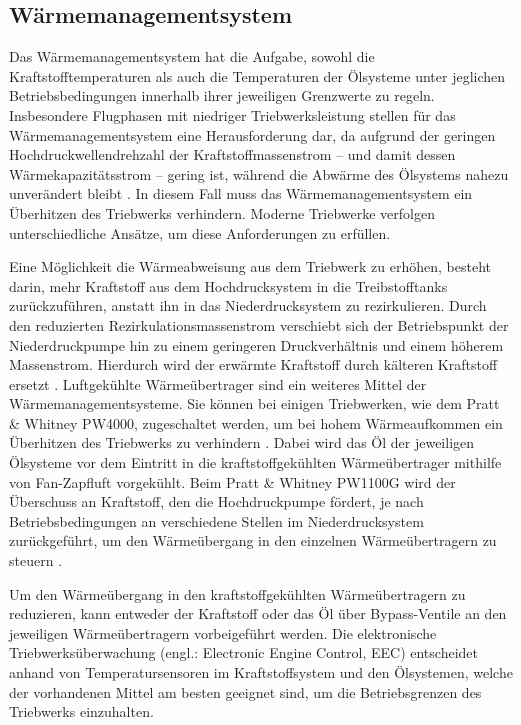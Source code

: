 \subsection{Wärmemanagementsystem}

Das Wärmemanagementsystem hat die Aufgabe, sowohl die Kraftstofftemperaturen als auch die Temperaturen der Ölsysteme unter jeglichen Betriebsbedingungen innerhalb ihrer jeweiligen Grenzwerte zu regeln. Insbesondere Flugphasen mit niedriger Triebwerksleistung stellen für das Wärmemanagementsystem eine Herausforderung dar, da aufgrund der geringen Hochdruckwellendrehzahl der Kraftstoffmassenstrom – und damit dessen Wärmekapazitätsstrom – gering ist, während die Abwärme des Ölsystems nahezu unverändert bleibt \cite{Braunling.2015}. In diesem Fall muss das Wärmemanagementsystem ein Überhitzen des Triebwerks verhindern. Moderne Triebwerke verfolgen unterschiedliche Ansätze, um diese Anforderungen zu erfüllen. 

Eine Möglichkeit die Wärmeabweisung aus dem Triebwerk zu erhöhen, besteht darin, mehr Kraftstoff aus dem Hochdrucksystem in die Treibstofftanks zurückzuführen, anstatt ihn in das Niederdrucksystem zu rezirkulieren. Durch den reduzierten Rezirkulationsmassenstrom verschiebt sich der Betriebspunkt der Niederdruckpumpe hin zu einem geringeren Druckverhältnis und einem höherem Massenstrom. Hierdurch wird der erwärmte Kraftstoff durch kälteren Kraftstoff ersetzt \cite{LinkeDiesinger.2014}. Luftgekühlte Wärmeübertrager sind ein weiteres Mittel der Wärmemanagementsysteme. Sie können bei einigen Triebwerken, wie dem Pratt \& Whitney PW4000, zugeschaltet werden, um bei hohem Wärmeaufkommen ein Überhitzen des Triebwerks zu verhindern \cite{LinkeDiesinger.2014}. Dabei wird das Öl der jeweiligen Ölsysteme vor dem Eintritt in die kraftstoffgekühlten Wärmeübertrager mithilfe von Fan-Zapfluft vorgekühlt. Beim Pratt \& Whitney PW1100G wird der Überschuss an Kraftstoff, den die Hochdruckpumpe fördert, je nach Betriebsbedingungen an verschiedene Stellen im Niederdrucksystem zurückgeführt, um den Wärmeübergang in den einzelnen Wärmeübertragern zu steuern \cite{AviationKnowledge.2021}. 

Um den Wärmeübergang in den kraftstoffgekühlten Wärmeübertragern zu reduzieren, kann entweder der Kraftstoff oder das Öl über Bypass-Ventile an den jeweiligen Wärmeübertragern vorbeigeführt werden. Die elektronische Triebwerksüberwachung (engl.: Electronic Engine Control, EEC) entscheidet anhand von Temperatursensoren im Kraftstoffsystem und den Ölsystemen, welche der vorhandenen Mittel am besten geeignet sind, um die Betriebsgrenzen des Triebwerks einzuhalten. \cite{LinkeDiesinger.2014}

